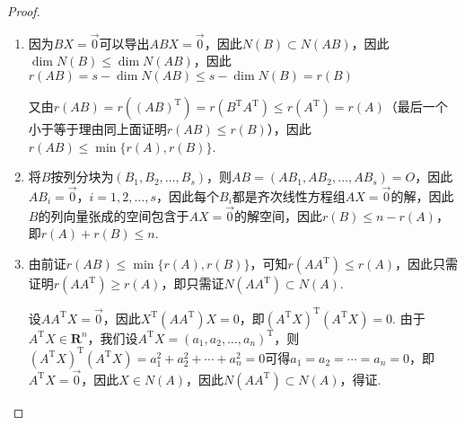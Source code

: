 \begin{proof}
    \begin{enumerate}
        \item 因为$BX=\vec{0}$可以导出$ABX=\vec{0}$，因此$N(B)\subset N(AB)$，因此$\dim N(B)\leqslant\dim N(AB)$，因此$r(AB)=s-\dim N(AB)\leqslant s-\dim N(B)=r(B)$

              又由$r(AB)=r((AB)^{\mathrm{T}})=r(B^{\mathrm{T}}A^{\mathrm{T}})\leqslant r(A^{\mathrm{T}})=r(A)$（最后一个小于等于理由同上面证明$r(AB)\leqslant r(B)$），因此$r(AB)\leqslant\min\{r(A),r(B)\}$.

        \item 将$B$按列分块为$(B_1,B_2,\ldots,B_s)$，则$AB=(AB_1,AB_2,\ldots,AB_s)=O$，因此$AB_i=\vec{0}$，$i=1,2,\ldots,s$，因此每个$B_i$都是齐次线性方程组$AX=\vec{0}$的解，因此$B$的列向量张成的空间包含于$AX=\vec{0}$的解空间，因此$r(B)\leqslant n-r(A)$，即$r(A)+r(B)\leqslant n$.

        \item 由前证$r(AB)\leqslant\min\{r(A),r(B)\}$，可知$r(AA^\mathrm{T})\leqslant r(A)$，因此只需证明$r(AA^\mathrm{T})\geqslant r(A)$，即只需证$N(AA^\mathrm{T})\subset N(A)$.

              设$AA^\mathrm{T}X=\vec{0}$，因此$X^\mathrm{T}(AA^\mathrm{T})X=0$，即$(A^\mathrm{T}X)^\mathrm{T}(A^\mathrm{T}X)=0$. 由于$A^\mathrm{T}X\in\mathbf{R}^n$，我们设$A^\mathrm{T}X=(a_1,a_2,\ldots,a_n)^\mathrm{T}$，则$(A^\mathrm{T}X)^\mathrm{T}(A^\mathrm{T}X)=a_1^2+a_2^2+\cdots+a_n^2=0$可得$a_1=a_2=\cdots=a_n=0$，即$A^\mathrm{T}X=\vec{0}$，因此$X \in N(A)$，因此$N(AA^\mathrm{T})\subset N(A)$，得证.


\end{enumerate}
\end{proof}
